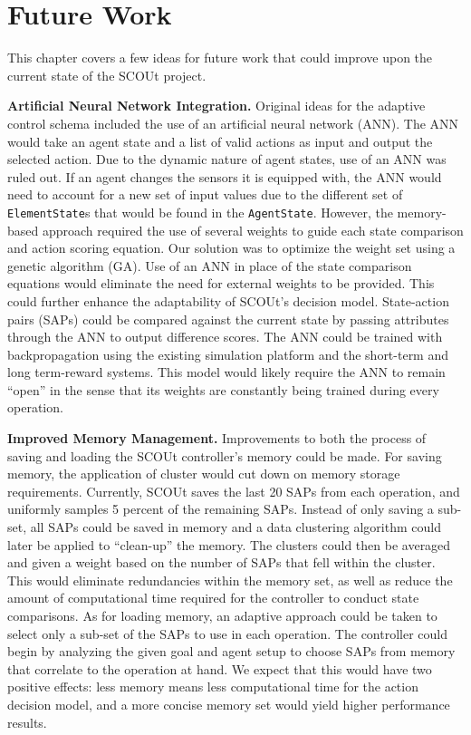 

\chapter{Future Work} \label{ch:future_work}
This chapter covers a few ideas for future work that could improve upon the current state of the SCOUt project.

\noindent
\textbf{Artificial Neural Network Integration.}
Original ideas for the adaptive control schema included the use of an artificial neural network (ANN).
The ANN would take an agent state and a list of valid actions as input and output the selected action.
Due to the dynamic nature of agent states, use of an ANN was ruled out.
If an agent changes the sensors it is equipped with, the ANN would need to account for a new set of input values due to the different set of \texttt{ElementState}s that would be found in the \texttt{AgentState}.
However, the memory-based approach required the use of several weights to guide each state comparison and action scoring equation.
Our solution was to optimize the weight set using a genetic algorithm (GA).
Use of an ANN in place of the state comparison equations would eliminate the need for external weights to be provided.
This could further enhance the adaptability of SCOUt's decision model.
State-action pairs (SAPs) could be compared against the current state by passing attributes through the ANN to output difference scores.
The ANN could be trained with backpropagation using the existing simulation platform and the short-term and long term-reward systems.
This model would likely require the ANN to remain ``open'' in the sense that its weights are constantly being trained during every operation.

\noindent
\textbf{Improved Memory Management.}
Improvements to both the process of saving and loading the SCOUt controller's memory could be made.
For saving memory, the application of cluster would cut down on memory storage requirements.
Currently, SCOUt saves the last 20 SAPs from each operation, and uniformly samples 5 percent of the remaining SAPs.
Instead of only saving a sub-set, all SAPs could be saved in memory and a data clustering algorithm could later be applied to ``clean-up'' the memory.
The clusters could then be averaged and given a weight based on the number of SAPs that fell within the cluster.
This would eliminate redundancies within the memory set, as well as reduce the amount of computational time required for the controller to conduct state comparisons.
As for loading memory, an adaptive approach could be taken to select only a sub-set of the SAPs to use in each operation.
The controller could begin by analyzing the given goal and agent setup to choose SAPs from memory that correlate to the operation at hand.
We expect that this would have two positive effects: less memory means less computational time for the action decision model, and a more concise memory set would yield higher performance results.

